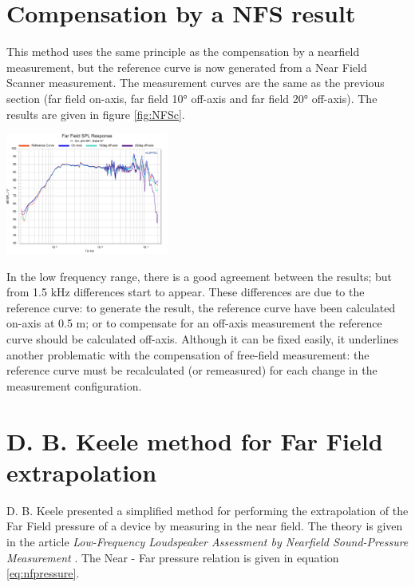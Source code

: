 \documentclass{report}
\begin{document}
\section{Compensation by a NFS result}

This method uses the same principle as the compensation by a nearfield measurement, but the reference curve is now generated from a Near Field Scanner measurement. The measurement curves are the same as the previous section (far field on-axis, far field 10° off-axis and far field 20° off-axis). The results are given in figure \ref{fig:NFSc}.\\

\begin{center}
	\includegraphics[width=0.4\textwidth]{RoomComp/NFS_compa} 
    \captionsetup{hypcap=false} 
	\label{fig:NFSc}
\end{center}

In the low frequency range, there is a good agreement between the results; but from 1.5 kHz differences start to appear. These differences are due to the reference curve: to generate the result, the reference curve have been calculated on-axis at 0.5 m; or to compensate for an off-axis measurement the reference curve should be calculated off-axis. Although it can be fixed easily, it underlines another problematic with the compensation of free-field measurement: the reference curve must be recalculated (or remeasured) for each change in the measurement configuration.

\section{D. B. Keele method for Far Field extrapolation}
\label{sec:dBKeele}

D. B. Keele presented a simplified method for performing the extrapolation of the Far Field pressure of a device by measuring in the near field. The theory is given in the article \textit{Low-Frequency Loudspeaker Assessment by Nearfield Sound-Pressure Measurement} \citep[see][]{dkeele}. The Near - Far pressure relation is given in equation \ref{eq:nfpressure}.
\end{document}
